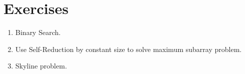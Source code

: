 \documentclass[../main.tex]{subfiles}
\begin{document}





 


\section{Exercises}
\begin{enumerate}
    \item Binary Search.
    \item Use Self-Reduction by constant size to solve maximum subarray problem. 
    \item Skyline problem.
\end{enumerate}
\end{document}
